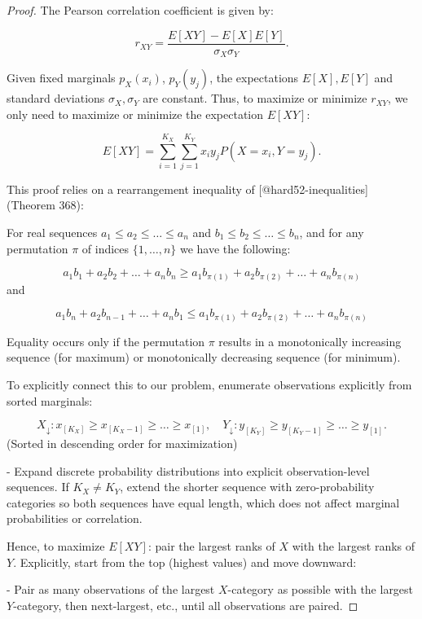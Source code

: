 \documentclass[
  12pt,
]{article}
\begin{document}
\begin{proof}



The Pearson correlation coefficient is given by:

$$r_{XY} = \frac{E[XY] - E[X]E[Y]}{\sigma_X \sigma_Y}.$$

Given fixed marginals $p_X(x_i)$, $p_Y(y_j)$, the expectations $E[X], E[Y]$ and standard deviations $\sigma_X, \sigma_Y$ are constant. Thus, to maximize or minimize $r_{XY}$, we only need to maximize or minimize the expectation $E[XY]$:

$$E[XY] = \sum_{i=1}^{K_X}\sum_{j=1}^{K_Y} x_i y_j P(X = x_i, Y = y_j).$$

This proof relies on a rearrangement inequality of [@hard52-inequalities] (Theorem 368): 

For real sequences $a_1 \leq a_2 \leq \dots \leq a_n$ and $b_1 \leq b_2 \leq \dots \leq b_n$, and for any permutation $\pi$ of indices $\{1,\dots,n\}$ we have the following:

    

$$a_1 b_1 + a_2 b_2 + \dots + a_n b_n \geq a_1 b_{\pi(1)} + a_2 b_{\pi(2)} + \dots + a_n b_{\pi(n)}$$
and
 
    
$$a_1 b_n + a_2 b_{n-1} + \dots + a_n b_1 \leq a_1 b_{\pi(1)} + a_2 b_{\pi(2)} + \dots + a_n b_{\pi(n)}$$

Equality occurs only if the permutation $\pi$ results in a  monotonically increasing sequence (for maximum) or monotonically decreasing sequence (for minimum).



To explicitly connect this to our problem, enumerate observations explicitly from sorted marginals:
    
        $$X_{\downarrow}: x_{[K_X]} \geq x_{[K_X-1]} \geq \dots \geq x_{[1]}, \quad  
        Y_{\downarrow}: y_{[K_Y]} \geq y_{[K_Y-1]} \geq \dots \geq y_{[1]}.$$
(Sorted in descending order for maximization)

- Expand discrete probability distributions into explicit observation-level sequences. 
If $K_X \neq K_Y$, extend the shorter sequence with zero-probability categories so both sequences have equal length, which does not affect marginal probabilities or correlation.

Hence, to maximize $E[XY]$: pair the largest ranks of $X$ with the largest ranks of $Y$. Explicitly, start from the top (highest values) and move downward:
    
- Pair as many observations of the largest $X$-category as possible with the largest $Y$-category, then next-largest, etc., until all observations are paired.
        

\end{proof}
\end{document}

